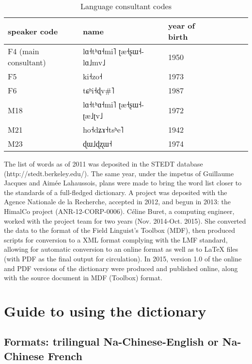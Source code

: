 \documentclass[oldfontcommands,oneside,a4paper,11pt]{article}
\newcommand{\ipa}[1]{{\phon #1}} %
\begin{document}
	\begin{table}[H]
		\caption{Language consultant codes}
		\centering \label{tab:consul}
		\begin{tabular}{lllllll}
			\toprule
			speaker code &   name &  year of birth \\
			\midrule
			F4 (main consultant) & \ipa{lɑ˧tʰɑ˧mi˥ ʈæ˧ʂɯ˧-lɑ˩mv˩} & 1950 \\ F5 &  \ipa{ki˧zo˧} & 1973  \\ F6 &  \ipa{tɕʰi˧ɖv\#˥} & 1987 \\ M18 &  \ipa{lɑ˧tʰɑ˧mi˥ ʈæ˧ʂɯ˧-ʈæ˩ʈv˩} & 1972 \\ M21 & \ipa{ho˧dʑɤ˧tsʰe˥} & 1942 \\ M23 & \ipa{ɖɯ˩ɖʐɯ˧} & 1974 \\
			\bottomrule
		\end{tabular}
	\end{table}
	
	The list of words as of 2011 was deposited in the STEDT database (http://stedt.berkeley.edu/). The same year, under the impetus of Guillaume Jacques and Aimée Lahaussois, plans were made to bring the word list closer to the standards of a full-fledged dictionary. A project was deposited with the Agence Nationale de la Recherche, accepted in 2012, and begun in 2013: the HimalCo project (ANR-12-CORP-0006). Céline Buret, a computing engineer, worked with the project team for two years (Nov. 2014-Oct. 2015). She converted the data to the format of the Field Linguist's Toolbox (MDF), then produced scripts for conversion to a XML format complying with the LMF standard, allowing for automatic conversion to an online format as well as to LaTeX files (with PDF as the final output for circulation). In 2015, version 1.0 of the online and PDF versions of the dictionary were produced and published online, along with the source document in MDF (Toolbox) format.
	
	\section{Guide to using the dictionary} \label{sec:howto}
	
	\subsection{Formats: trilingual Na-Chinese-English or Na-Chinese French} \label{sec:versions}
	
\end{document}
